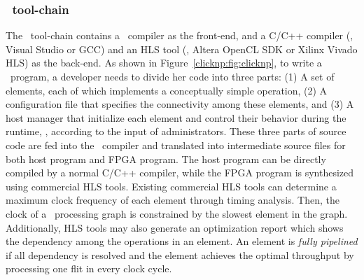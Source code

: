 \subsubsection{\name\ tool-chain}
\label{clicknp:subsec:toolchain}
The \name\ tool-chain contains a \name\ compiler as the front-end, and a C/C++ compiler (\eg, Visual Studio or GCC) and an HLS tool 
(\eg, Altera OpenCL SDK or Xilinx Vivado HLS) as the back-end.
As shown in Figure~\ref{clicknp:fig:clicknp}, to write a \name\ program, a developer needs to divide her code into three parts:
(1) A set of elements, each of which implements a conceptually simple operation,
(2) A configuration file that specifies the connectivity among these elements,
and (3) A host manager that initialize each element and control their behavior during the runtime, \eg, according to the input of administrators.
%
These three parts of source code are fed into the \name\ compiler and translated 
into intermediate source files for both host program and FPGA program. 
The host program can be directly compiled by a normal C/C++ compiler, while the FPGA program is synthesized using commercial HLS tools.
%
Existing commercial HLS tools can determine a maximum clock frequency of 
each element through timing analysis. 
Then, the clock of a \name\ processing graph is constrained by the slowest element in the graph.
%
Additionally, HLS tools may also generate an optimization report which shows the 
dependency among the operations in an element. An element is \textit{fully pipelined}
if all dependency is resolved and the element achieves the optimal throughput by 
processing one flit in every clock cycle.


